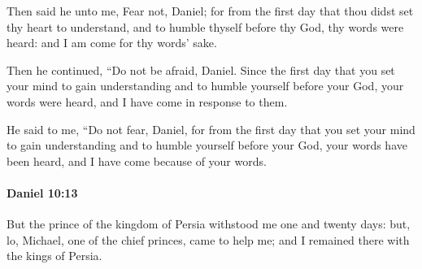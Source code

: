 			\begin{versebox}
					\item[BHS] 
					\item[LXX] 
					\item[ASV] Then said he unto me, Fear not, Daniel; for from the first day that thou didst set thy heart to understand, and to humble thyself before thy God, thy words were heard: and I am come for thy words' sake.
					\item[NIV] Then he continued, “Do not be afraid, Daniel. Since the first day that you set your mind to gain understanding and to humble yourself before your God, your words were heard, and I have come in response to them.
					\item[NRSV] He said to me, “Do not fear, Daniel, for from the first day that you set your mind to gain understanding and to humble yourself before your God, your words have been heard, and I have come because of your words.
			\end{versebox}

		\paragraph{Daniel 10:13} %
			\label{DANIEL-10-13}

			But the prince of the kingdom of Persia withstood me one and twenty days: but, lo, Michael, one of the chief princes, came to help me; and I remained there with the kings of Persia.

